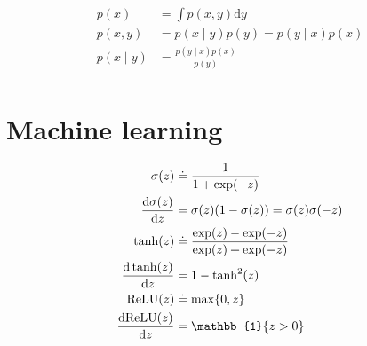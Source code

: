 \documentclass[a4paper]{article}
\begin{document}
\begin{align*}
    p(x)        & = \int p(x, y) \mathrm{d}y            \\
    p(x, y)     & = p(x \mid y) p(y) = p(y \mid x) p(x) \\
    p(x \mid y) & = \frac{p(y \mid x) p(x)}{p(y)}       \\
\end{align*}

\section*{\textsf{Machine learning}}

\begin{align*}
    \sigma(z)                 & \doteq \frac{1}{1 + \exp(-z)}                        \\
    \odv{\sigma(z)}{z}        & = \sigma(z) (1 - \sigma(z)) = \sigma(z) \sigma(-z)   \\
    \tanh(z)                  & \doteq \frac{\exp(z) - \exp(-z)}{\exp(z) + \exp(-z)} \\
    \odv{\tanh(z)}{z}         & = 1 - \tanh^2(z)                                     \\
    \mathrm{ReLU}(z)          & \doteq \max \{ 0, z \}                               \\
    \odv{\mathrm{ReLU}(z)}{z} & = \mathbb{1}\{ z > 0 \}                              \\
\end{align*}
\end{document}
